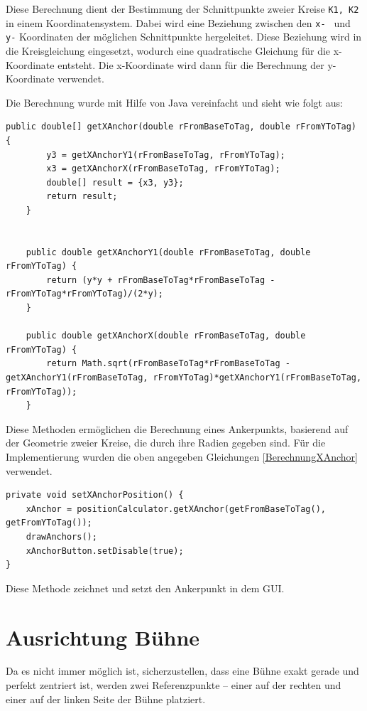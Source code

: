 Diese Berechnung dient der Bestimmung der Schnittpunkte zweier Kreise \texttt{K1, K2} in einem Koordinatensystem. Dabei wird eine Beziehung zwischen den \texttt{x- } und \texttt{y-} Koordinaten der möglichen Schnittpunkte hergeleitet. Diese Beziehung wird in die Kreisgleichung eingesetzt, wodurch eine quadratische Gleichung für die x-Koordinate entsteht. Die x-Koordinate wird dann für die Berechnung der y-Koordinate verwendet.
\newpage

Die Berechnung wurde mit Hilfe von Java vereinfacht und sieht wie folgt aus:
\begin{lstlisting}[style=Java, caption=Auszug aus PositionCalculator.java, captionpos=b]
	 public double[] getXAnchor(double rFromBaseToTag, double rFromYToTag) {
		y3 = getXAnchorY1(rFromBaseToTag, rFromYToTag);
		x3 = getXAnchorX(rFromBaseToTag, rFromYToTag);
		double[] result = {x3, y3};
		return result;
	}
	
	
	public double getXAnchorY1(double rFromBaseToTag, double rFromYToTag) {
		return (y*y + rFromBaseToTag*rFromBaseToTag - rFromYToTag*rFromYToTag)/(2*y);
	}
	
	public double getXAnchorX(double rFromBaseToTag, double rFromYToTag) {
		return Math.sqrt(rFromBaseToTag*rFromBaseToTag - getXAnchorY1(rFromBaseToTag, rFromYToTag)*getXAnchorY1(rFromBaseToTag, rFromYToTag));
	}
\end{lstlisting}

Diese Methoden ermöglichen die Berechnung eines Ankerpunkts, basierend auf der Geometrie zweier Kreise, die durch ihre Radien gegeben sind. Für die Implementierung wurden die oben angegeben Gleichungen \ref{BerechnungXAnchor} verwendet.

\begin{lstlisting}[style=Java, caption=xAnchor Berechnung, captionpos=b]
	private void setXAnchorPosition() {
	xAnchor = positionCalculator.getXAnchor(getFromBaseToTag(), getFromYToTag());
	drawAnchors();
	xAnchorButton.setDisable(true);
}
\end{lstlisting}

Diese Methode zeichnet und setzt den Ankerpunkt in dem GUI. 

\newpage
\section{Ausrichtung Bühne}
Da es nicht immer möglich ist, sicherzustellen, dass eine Bühne exakt gerade und perfekt zentriert ist, werden zwei Referenzpunkte – einer auf der rechten und einer auf der linken Seite der Bühne platziert.

